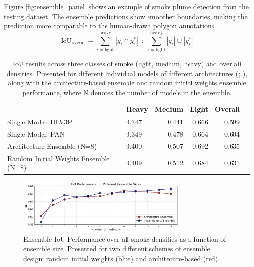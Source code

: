 \documentclass{article}
\begin{document}
Figure \ref{fig:ensemble_panel} shows an example of smoke plume detection from the testing dataset. The ensemble predictions show smoother boundaries, making the prediction more comparable to the human-drawn polygon annotations.
\begin{equation} \label{overall_iou}
    \text{IoU}_{\text{overall}} = {\sum\limits_{i=\text{light}}^{\text{heavy}}|y_{i}\cap y^*_{i}|} \div {\sum\limits_{i=\text{light}}^{\text{heavy}}|y_{i}|\cup|y^*_{i}|}
\end{equation}
\begin{table}[h]
    \centering
    \begin{tabular}{llrrr>{\bfseries}r}
        \hline
            &   Heavy &   Medium &   Light &   Overall \\
        \hline
         Single Model: DLV3P &   0.347 &     0.441 &  0.666 &      0.599  \\
         Single Model: PAN &  0.349 &     0.478 &  0.664 &      0.604 \\
         Architecture Ensemble (N=8) &   0.400 &     0.507 &  0.692 &      0.635 \\
         Random Initial Weights Ensemble (N=8) &  0.409 &     0.512 &  0.684 &      0.631 \\
         \hline
    \end{tabular}
    \caption{IoU results across three classes of smoke (light, medium, heavy) and over all densities. Presented for different individual models of different architectures (\citep{dlv3p}; \citep{PAN}), along with the archiecture-based ensemble and random initial weights ensemble performance, where N denotes the number of models in the ensemble.}
    \label{tab:results}
    \end{table}
\begin{figure}[h]
    \centering
    \includegraphics[width=0.75\textwidth]{ensemble_size_plot.png}
    \caption{Ensemble IoU Performance over all smoke densities as a function of ensemble size. Presented for two different schemes of ensemble design: random initial weights (blue) and architecure-based (red).}
    \label{fig:ensemble_size_plot}
\end{figure}
\end{document}
